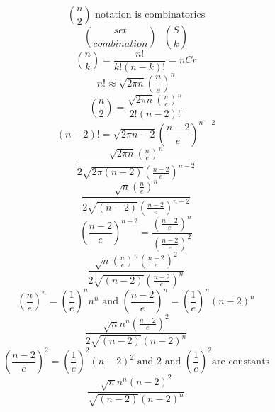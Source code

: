 \begin{equation}
     \binom{n}{2} \text{ notation is combinatorics}
\end{equation}
\begin{equation}
     {set\choose combination} \text{ } {S\choose k}
\end{equation}
\begin{equation}
     \binom{n}{k} = \frac{n!}{k!(n-k)!} = nCr
\end{equation}
\begin{equation}
  n! \approx \sqrt{2 \pi n}\left(\frac{n}{e}\right)^n
\end{equation}
\begin{equation}
     \binom{n}{2} = \frac{\sqrt{2 \pi n}\left(\frac{n}{e}\right)^n}{2!(n-2)!} 
\end{equation}
\begin{equation}
    (n-2)! = \sqrt{2 \pi n-2}\left(\frac{n-2}{e}\right)^{n-2}
\end{equation}
\begin{equation}
    \frac{\sqrt{2 \pi n}\left(\frac{n}{e}\right)^n}{2\sqrt{2 \pi (n-2)}\left(\frac{n-2}{e}\right)^{n-2}} 
\end{equation}
\begin{equation}
    \frac{\sqrt{n}\left(\frac{n}{e}\right)^n}{2\sqrt{(n-2)}\left(\frac{n-2}{e}\right)^{n-2}} 
\end{equation}
\begin{equation}
  \left(\frac{n-2}{e}\right)^{n-2}  = \frac{\left(\frac{n-2}{e}\right)^n}{\left(\frac{n-2}{e}\right)^2}
\end{equation}
\begin{equation}
    \frac{\sqrt{n}\left(\frac{n}{e}\right)^n{\left(\frac{n-2}{e}\right)^2}}{2\sqrt{(n-2)}\left(\frac{n-2}{e}\right)^n} 
\end{equation}
\begin{equation}
  \left(\frac{n}{e}\right)^n = \left(\frac{1}{e}\right)^n n^n \text{ and } \left(\frac{n-2}{e}\right)^n = \left(\frac{1}{e}\right)^n (n-2)^n
\end{equation}
\begin{equation}
    \frac{\sqrt{n}n^n{\left(\frac{n-2}{e}\right)^2}}{2\sqrt{(n-2)}(n-2)^n} 
\end{equation}
\begin{equation}
    \left(\frac{n-2}{e}\right)^2 = \left(\frac{1}{e}\right)^2 (n-2)^2 \text{ and } 2 \text{ and } \left(\frac{1}{e}\right)^2 \text{are constants}
\end{equation}
\begin{equation}
    \frac{\sqrt{n}n^n{(n-2)^2}}{\sqrt{(n-2)}(n-2)^n} 
\end{equation}
